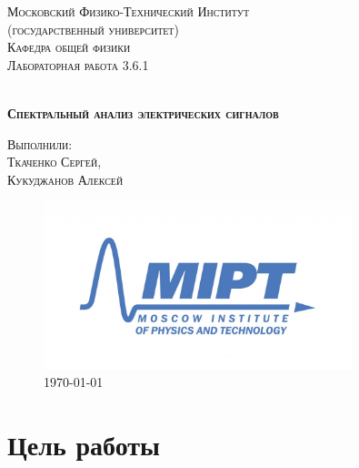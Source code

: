 \documentclass[a4paper, 12pt]{article}
\begin{document}
\begin{titlepage}
\centering
\textsc{\LARGE Московский Физико-Технический Институт\\[0.1cm] \large(государственный университет)}\\[1.0cm]
\textsc{\Large Кафедра общей физики}\\[0.5cm]
\textsc{\large Лабораторная работа 3.6.1}\\[1.0cm]


\hrulefill 

\textsc{\\[0.6cm] \LARGE \textbf{Спектральный анализ электрических сигналов} }\\[0.6cm] 

\hrulefill



\begin{flushleft}
	\begin{minipage}{0.5\textwidth}
		\textsc{\large Выполнили: \\Ткаченко Сергей, \\ Кукуджанов Алексей}\\
	\end{minipage}
\end{flushleft}


\begin{figure}[b!]
	\centering
		\includegraphics[width = 0.8\textwidth]{Im1.jpg}\\
		\today
\end{figure}





\end{titlepage}

\section{Цель работы}
\end{document}
